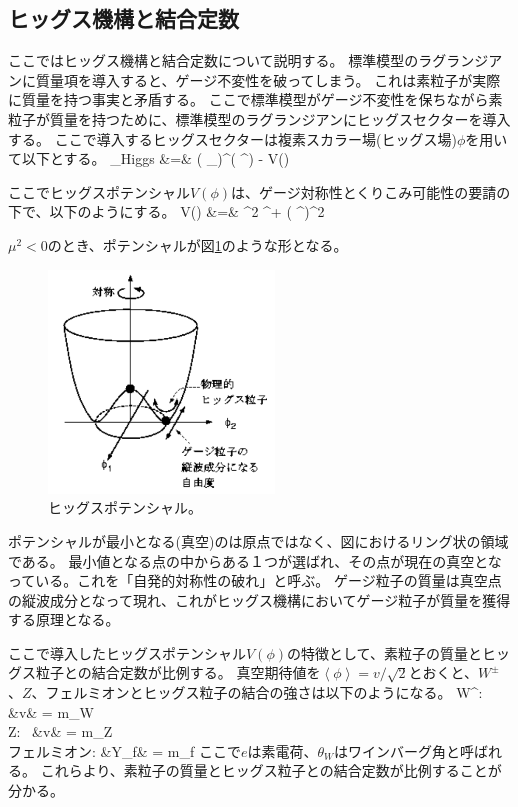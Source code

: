 \subsection{ヒッグス機構と結合定数}

ここではヒッグス機構と結合定数について説明する\cite{1-12}。
標準模型のラグランジアンに質量項を導入すると、ゲージ不変性を破ってしまう。
これは素粒子が実際に質量を持つ事実と矛盾する。
ここで標準模型がゲージ不変性を保ちながら素粒子が質量を持つために、標準模型のラグランジアンにヒッグスセクターを導入する。
ここで導入するヒッグスセクターは複素スカラー場(ヒッグス場)$\phi$を用いて以下とする。
\bbb
\label{higgs_sector}
_{\rm Higgs} &=&  \left( \partial_\mu \phi \right)^\dag \left( \partial^\mu \phi \right) - V(\phi) \\
\eee

ここでヒッグスポテンシャル$V(\phi)$は、ゲージ対称性とくりこみ可能性の要請の下で、以下のようにする。
\bbb
V(\phi)  &=& \mu^2 \phi^\dag \phi + \lambda \left( \phi^\dag \phi \right)^2
\eee

$\mu^2<0$のとき、ポテンシャルが図\ref{higgs_potential}のような形となる。

\begin{figure}[bpt]\centering
\includegraphics[width=6cm]{./higgs_potential.png}
\caption[ヒッグスポテンシャル]{ヒッグスポテンシャル\cite{1-13}。}
\label{higgs_potential}
\end{figure}

ポテンシャルが最小となる(真空)のは原点ではなく、図におけるリング状の領域である。
最小値となる点の中からある１つが選ばれ、その点が現在の真空となっている。これを「自発的対称性の破れ」と呼ぶ。
ゲージ粒子の質量は真空点の縦波成分となって現れ、これがヒッグス機構においてゲージ粒子が質量を獲得する原理となる。

ここで導入したヒッグスポテンシャル$V(\phi)$の特徴として、素粒子の質量とヒッグス粒子との結合定数が比例する。
真空期待値を$\left< \phi \right> =v/\sqrt{2}$とおくと、$W^{\pm}$、$Z$、フェルミオンとヒッグス粒子の結合の強さは以下のようになる。
\bbb
W^{\pm}:      &v&    = m_W \\
Z:~           &v& = m_Z \\
フェルミオン: &Y_f&               = m_f 
\eee
ここで$e$は素電荷、$\theta_W$はワインバーグ角と呼ばれる。
これらより、素粒子の質量とヒッグス粒子との結合定数が比例することが分かる。

